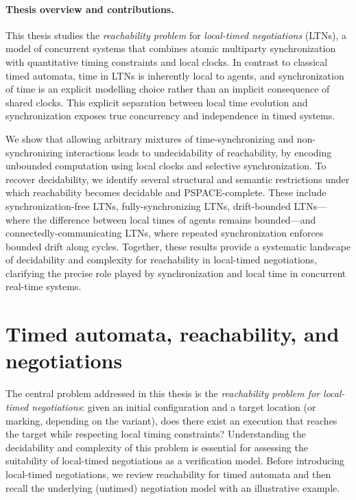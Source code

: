 \paragraph{Thesis overview and contributions.}
This thesis studies the \emph{reachability problem} for \emph{local-timed negotiations} (LTNs), a model of concurrent systems that combines atomic multiparty synchronization with quantitative timing constraints and local clocks. In contrast to classical timed automata, time in LTNs is inherently local to agents, and synchronization of time is an explicit modelling choice rather than an implicit consequence of shared clocks. This explicit separation between local time evolution and synchronization exposes true concurrency and independence in timed systems.

We show that allowing arbitrary mixtures of time-synchronizing and non-synchronizing interactions leads to undecidability of reachability, by encoding unbounded computation using local clocks and selective synchronization. To recover decidability, we identify several structural and semantic restrictions under which reachability becomes decidable and PSPACE-complete. These include synchronization-free LTNs, fully-synchronizing LTNs, drift-bounded LTNs—where the difference between local times of agents remains bounded—and connectedly-communicating LTNs, where repeated synchronization enforces bounded drift along cycles. Together, these results provide a systematic landscape of decidability and complexity for reachability in local-timed negotiations, clarifying the precise role played by synchronization and local time in concurrent real-time systems.


\section{Timed automata, reachability, and negotiations}
\label{sec:intro-models}

The central problem addressed in this thesis is the \emph{reachability problem for local-timed negotiations}: given an initial configuration and a target location (or marking, depending on the variant), does there exist an execution that reaches the target while respecting local timing constraints? Understanding the decidability and complexity of this problem is essential for assessing the suitability of local-timed negotiations as a verification model. Before introducing local-timed negotiations, we review reachability for timed automata and then recall the underlying (untimed) negotiation model with an illustrative example.

